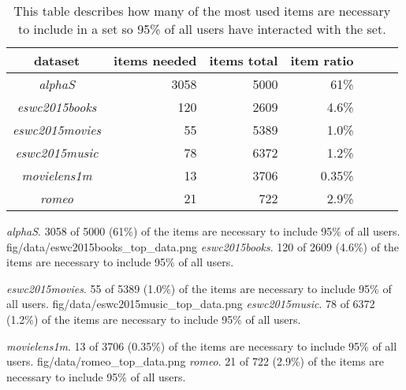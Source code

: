 \begin{table}[h!]
    \centering
    \begin{tabular}{| c | r | r | r | r | r | l |}
        \hline
        \textbf{dataset}        & \textbf{items needed}  & \textbf{items total} & \textbf{item ratio}  \\ \hline

        \textit{alphaS}         &   3058          & 5000 & 61\%              \\ \hline
        \textit{eswc2015books}  &   120           & 2609 & 4.6\%                \\ \hline
        \textit{eswc2015movies} &   55            & 5389 & 1.0\%               \\ \hline
        \textit{eswc2015music}  &   78            & 6372 & 1.2\%               \\ \hline
        \textit{movielens1m}    &   13            & 3706 & 0.35\%               \\ \hline
        \textit{romeo}          &   21            & 722  & 2.9\%               \\ \hline

    \end{tabular}
    \caption{This table describes how many of the most used items are necessary to include in a set so 95\% of all users have interacted with the set.}
    \label{tab:top_data}
\end{table}

{\textit{alphaS}. 3058 of 5000 (61\%) of the items are necessary to include 95\% of all users.}
{fig/data/eswc2015books_top_data.png}
{\textit{eswc2015books}. 120 of 2609 (4.6\%) of the items are necessary to include 95\% of all users.}

{\textit{eswc2015movies}. 55 of 5389 (1.0\%) of the items are necessary to include 95\% of all users.}
{fig/data/eswc2015music_top_data.png}
{\textit{eswc2015music}. 78 of 6372 (1.2\%) of the items are necessary to include 95\% of all users.}

{\textit{movielens1m}. 13 of 3706 (0.35\%) of the items are necessary to include 95\% of all users.}
{fig/data/romeo_top_data.png}
{\textit{romeo}. 21 of 722 (2.9\%) of the items are necessary to include 95\% of all users.}


